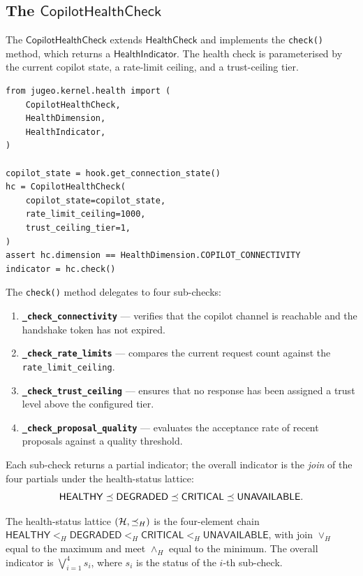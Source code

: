 \documentclass[11pt]{article}
\newcommand{\CHC}{\mathsf{CopilotHealthCheck}}
\newcommand{\HC}{\mathsf{HealthCheck}}
\newcommand{\HI}{\mathsf{HealthIndicator}}
\begin{document}
\subsection{The \texorpdfstring{$\CHC$}{CopilotHealthCheck}}

The $\CHC$ extends $\HC$ and implements
the \texttt{check()} method, which returns a $\HI$.  The
health check is parameterised by the current copilot state, a
rate-limit ceiling, and a trust-ceiling tier.

\begin{lstlisting}[style=jugeo-python, caption={Constructing a
  $\CHC$ and running a check.}]
from jugeo.kernel.health import (
    CopilotHealthCheck,
    HealthDimension,
    HealthIndicator,
)

copilot_state = hook.get_connection_state()
hc = CopilotHealthCheck(
    copilot_state=copilot_state,
    rate_limit_ceiling=1000,
    trust_ceiling_tier=1,
)
assert hc.dimension == HealthDimension.COPILOT_CONNECTIVITY
indicator = hc.check()
\end{lstlisting}

The \texttt{check()} method delegates to four sub-checks:

\begin{enumerate}
  \item \textbf{\texttt{\_check\_connectivity}} — verifies that
        the copilot channel is reachable and the handshake token
        has not expired.
  \item \textbf{\texttt{\_check\_rate\_limits}} — compares the
        current request count against the
        \texttt{rate\_limit\_ceiling}.
  \item \textbf{\texttt{\_check\_trust\_ceiling}} — ensures that
        no response has been assigned a trust level above the
        configured tier.
  \item \textbf{\texttt{\_check\_proposal\_quality}} — evaluates
        the acceptance rate of recent proposals against a
        quality threshold.
\end{enumerate}

Each sub-check returns a partial indicator; the overall indicator
is the \emph{join} of the four partials under the health-status
lattice:
\[
  \mathsf{HEALTHY} \preceq \mathsf{DEGRADED} \preceq
  \mathsf{CRITICAL} \preceq \mathsf{UNAVAILABLE}.
\]

\begin{definition}\label{def:health-lattice}
The health-status lattice $(\mathcal{H}, \preceq_H)$ is the
four-element chain
$\mathsf{HEALTHY} <_H \mathsf{DEGRADED} <_H
 \mathsf{CRITICAL} <_H \mathsf{UNAVAILABLE}$,
with join $\vee_H$ equal to the maximum and meet $\wedge_H$
equal to the minimum.  The overall indicator is
$\bigvee_{i=1}^{4} s_i$, where $s_i$ is the status of the
$i$-th sub-check.
\end{definition}
\end{document}
